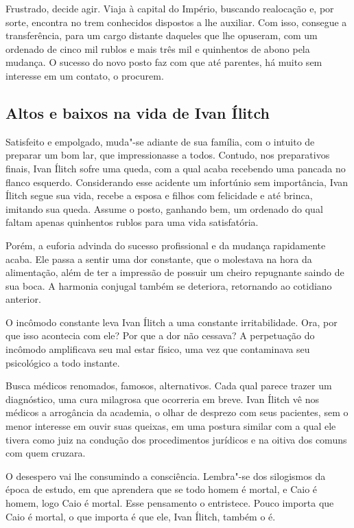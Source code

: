 \documentclass[12pt]{extarticle}
\begin{document}
Frustrado, decide agir. Viaja à capital do Império, buscando realocação
e, por sorte, encontra no trem conhecidos dispostos a lhe auxiliar. Com
isso, consegue a transferência, para um cargo distante daqueles que lhe
opuseram, com um ordenado de cinco mil rublos e mais três mil e
quinhentos de abono pela mudança. O sucesso do novo posto faz 
com que até parentes, há muito sem interesse
em um contato, o procurem.

\subsection{Altos e baixos na vida de Ivan Ílitch}

Satisfeito e empolgado, muda"-se adiante de sua família, com o intuito de
preparar um bom lar, que impressionasse a todos. Contudo, nos 
preparativos finais, Ivan Ílitch sofre uma queda, com a
qual acaba recebendo uma pancada no flanco esquerdo. Considerando esse
acidente um infortúnio sem importância, Ivan Ílitch segue sua vida,
recebe a esposa e filhos com felicidade e até brinca, imitando sua
queda. Assume o posto, ganhando bem, um ordenado do qual faltam apenas
quinhentos rublos para uma vida satisfatória.

Porém, a euforia advinda
do sucesso profissional e da mudança rapidamente acaba. Ele passa a
sentir uma dor constante, que o molestava na hora da alimentação, além
de ter a impressão de possuir um cheiro repugnante saindo de sua boca. A
harmonia conjugal também se deteriora, retornando ao cotidiano anterior.

O incômodo constante leva Ivan Ílitch a uma constante irritabilidade.
Ora, por que isso acontecia com ele? Por que a dor não cessava? A
perpetuação do incômodo amplificava seu mal estar físico, uma vez que
contaminava seu psicológico a todo instante.

Busca médicos renomados, famosos, alternativos. Cada qual parece trazer
um diagnóstico, uma cura milagrosa que ocorreria em breve. Ivan Ílitch
vê nos médicos a arrogância da academia, o olhar de
desprezo com seus pacientes, sem o menor interesse em ouvir suas
queixas, em uma postura similar com a qual ele tivera como juiz na
condução dos procedimentos jurídicos e na oitiva dos comuns com quem
cruzara.

O desespero vai lhe consumindo a consciência. Lembra"-se dos silogismos
da época de estudo, em que aprendera que se todo homem é mortal, e Caio
é homem, logo Caio é mortal. Esse pensamento o entristece. Pouco importa
que Caio é mortal, o que importa é que ele, Ivan Ílitch, também o é.
\end{document}
